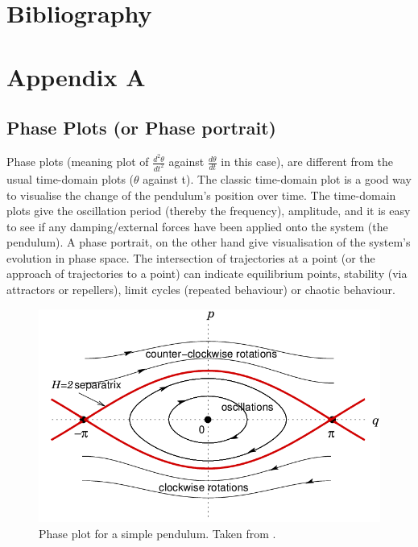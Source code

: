 \documentclass[10pt, twocolumn]{article}
\begin{document}
\newpage
\section{Bibliography}



\onecolumn
\newpage
\section{Appendix A}
\subsection{Phase Plots (or Phase portrait)} \label{phase plots appendix}
Phase plots (meaning plot of $\frac{d^2\theta}{dt^2}$ against $\frac{d\theta}{dt}$ in this case), are different from the usual time-domain plots ($\theta$ against t). The classic time-domain plot is a good way to visualise the change of the pendulum's position over time. The time-domain plots give the oscillation period (thereby the frequency), amplitude, and it is easy to see if any damping/external forces have been applied onto the system (the pendulum). A phase portrait, on the other hand give visualisation of the system's evolution in phase space. The intersection of trajectories at a point (or the approach of trajectories to a point) can indicate equilibrium points, stability (via attractors or repellers), limit cycles (repeated behaviour) or chaotic behaviour.
\begin{figure}[H]
    \centering
    \includegraphics[width = 0.7\columnwidth]{Projects/ForcedSimplePendulum/WrittenReport/figs/The-phase-space-of-the-simple-pendulum.png}
    \caption{Phase plot for a simple pendulum. Taken from \cite{Ball2007}.}
    \label{fig:enter-label}
\end{figure}
\end{document}
